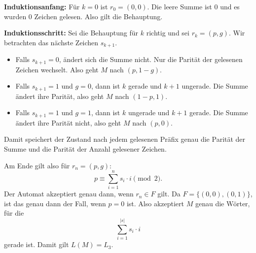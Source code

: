 \documentclass[a4paper,12pt]{article}
\begin{document}
\textbf{Induktionsanfang:}
Für $k=0$ ist $r_0=(0,0)$.
Die leere Summe ist $0$ und es wurden $0$ Zeichen gelesen.
Also gilt die Behauptung.

\textbf{Induktionsschritt:}
Sei die Behauptung für $k$ richtig und sei $r_k=(p,g)$.
Wir betrachten das nächste Zeichen $s_{k+1}$.
\begin{itemize}
    \item Falls $s_{k+1}=0$, ändert sich die Summe nicht. Nur die Parität der gelesenen Zeichen wechselt. Also geht $M$ nach $(p,1-g)$.
    \item Falls $s_{k+1}=1$ und $g=0$, dann ist $k$ gerade und $k+1$ ungerade. Die Summe ändert ihre Parität, also geht $M$ nach $(1-p,1)$.
    \item Falls $s_{k+1}=1$ und $g=1$, dann ist $k$ ungerade und $k+1$ gerade. Die Summe ändert ihre Parität nicht, also geht $M$ nach $(p,0)$.
\end{itemize}
Damit speichert der Zustand nach jedem gelesenen Präfix genau die Parität der Summe und die Parität der Anzahl gelesener Zeichen.

Am Ende gilt also für $r_n=(p,g)$:
\[
p \equiv \sum_{i=1}^{n} s_i \cdot i \pmod 2.
\]
Der Automat akzeptiert genau dann, wenn $r_n \in F$ gilt.
Da $F=\{(0,0),(0,1)\}$, ist das genau dann der Fall, wenn $p=0$ ist.
Also akzeptiert $M$ genau die Wörter, für die
\[
\sum_{i=1}^{|s|} s_i \cdot i
\]
gerade ist.
Damit gilt $L(M)=L_3$.
\end{document}
